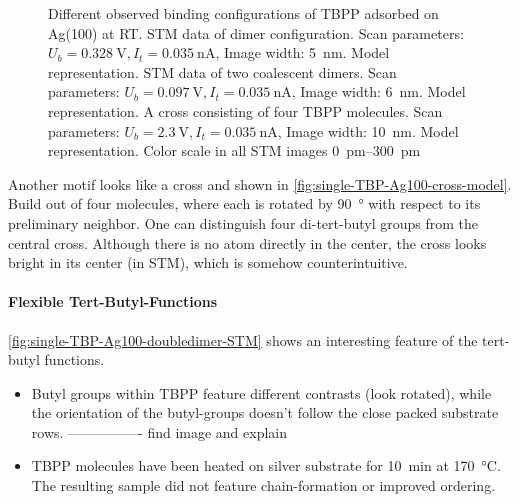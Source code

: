 \begin{figure}[]
{			\label{fig:single-TBP-Ag100-cross-model}
		}
		\caption{Different observed binding configurations of TBPP adsorbed on Ag(100) at RT.  STM data of dimer configuration. Scan parameters: $U_b=\SI{0.328}{\volt}, I_t=\SI{0.035}{\nano \ampere}$, Image width: \SI{5}{\nm}.  Model representation.  STM data of two coalescent dimers. Scan parameters: $U_b=\SI{0.097}{\volt}, I_t=\SI{0.035}{\nano \ampere}$, Image width: \SI{6}{\nm}.  Model representation.  A cross consisting of four TBPP molecules. Scan parameters: $U_b=\SI{2.3}{\volt}, I_t=\SI{0,035}{\nano \ampere}$, Image width: \SI{10}{\nm}.  Model representation. Color scale in all STM images \SIrange{0}{300}{\pico\meter}}
		\label{fig:single-TBP-Ag100-doubledimer}
	\end{figure}
	Another motif looks like a cross and shown in \autoref{fig:single-TBP-Ag100-cross-model}. Build out of four molecules, where each is rotated by \SI{90}{\degree} with respect to its preliminary neighbor. One can distinguish four di-tert-butyl groups from the central cross. Although there is no atom directly in the center, the cross looks bright in its center (in STM), which is somehow counterintuitive. 
	
	
	\paragraph{Flexible Tert-Butyl-Functions}
	\autoref{fig:single-TBP-Ag100-doubledimer-STM} shows an interesting feature of the tert-butyl functions.
	
	\begin{itemize}
		\item Butyl groups within TBPP feature different contrasts (look rotated), while the orientation of the butyl-groups doesn't follow the close packed substrate rows. ---------------- find image and explain
		\item TBPP molecules have been heated on silver substrate for \SI{10}{\minute} at \SI{170}{\celsius}. The resulting sample did not feature chain-formation or improved ordering.
	\end{itemize}
	
